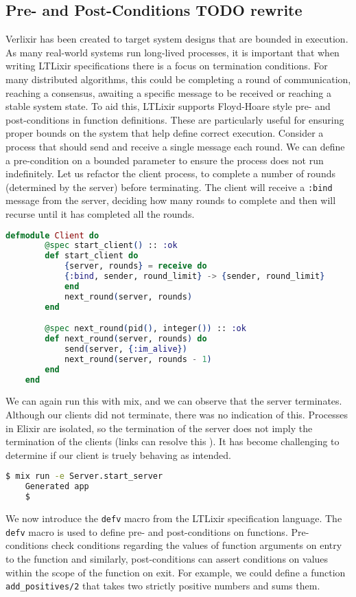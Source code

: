 \subsection{Pre- and Post-Conditions TODO rewrite} 
Verlixir has been created to target system designs that are bounded in execution. As many real-world systems run long-lived processes, it is important that when writing LTLixir specifications there is a focus on termination conditions. For many distributed algorithms, this could be completing a round of communication, reaching a consensus, awaiting a specific message to be received or reaching a stable system state. To aid this, LTLixir supports Floyd-Hoare style pre- and post-conditions in function definitions. These are particularly useful for ensuring proper bounds on the system that help define correct execution. Consider a process that should send and receive a single message each round. We can define a pre-condition on a bounded parameter to ensure the process does not run indefinitely. Let us refactor the client process, to complete a number of rounds (determined by the server) before terminating. The client will receive a \texttt{:bind} message from the server, deciding how many rounds to complete and then will recurse until it has completed all the rounds.
\begin{lstlisting}[language=Elixir, xleftmargin=.3\linewidth]
    defmodule Client do
        @spec start_client() :: :ok
        def start_client do
            {server, rounds} = receive do
            {:bind, sender, round_limit} -> {sender, round_limit}
            end
            next_round(server, rounds)
        end

        @spec next_round(pid(), integer()) :: :ok
        def next_round(server, rounds) do
            send(server, {:im_alive})
            next_round(server, rounds - 1)
        end
    end
\end{lstlisting}
We can again run this with mix, and we can observe that the server terminates. Although our clients did not terminate, there was no indication of this. Processes in Elixir are isolated, so the termination of the server does not imply the termination of the clients (links can resolve this \cite{elixir_links}). It has become challenging to determine if our client is truely behaving as intended.
\begin{lstlisting}[language=bash, xleftmargin=.3\linewidth]
    $ mix run -e Server.start_server
    Generated app
    $
\end{lstlisting}
We now introduce the \texttt{defv} macro from the LTLixir specification language. The \texttt{defv} macro is used to define pre- and post-conditions on functions. Pre-conditions check conditions regarding the values of function arguments on entry to the function and similarly, post-conditions can assert conditions on values within the scope of the function on exit. For example, we could define a function \texttt{add\_positives/2} that takes two strictly positive numbers and sums them.
